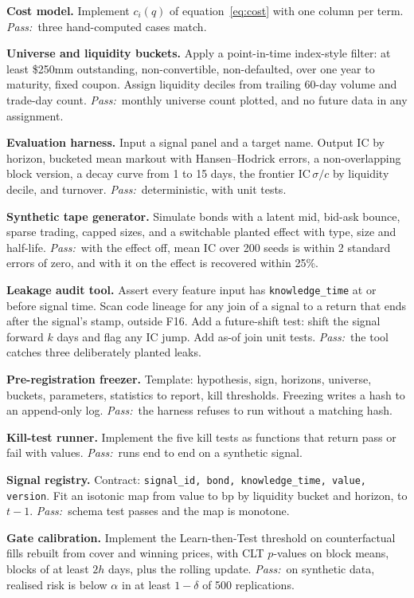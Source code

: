 \documentclass[11pt,letterpaper]{article}
\makeatletter
\newcommand{\code}[1]{\texttt{#1}}
\newcommand*{\twodigit}[1]{\expandafter\@twodigit\csname c@#1\endcsname}
\newcommand*{\@twodigit}[1]{\ifnum#1<10 0\fi\number#1}
\newcommand{\stepname}[1]{\textbf{#1.}}
\newcommand{\Pass}{\textit{Pass:}~}
\makeatother
\begin{document}
\begin{ladder}[label=\textbf{F\twodigit*}]
\item \stepname{Cost model} Implement $c_i(q)$ of equation~\eqref{eq:cost} with one column per term. \Pass three hand-computed cases match.
\item \stepname{Universe and liquidity buckets} Apply a point-in-time index-style filter: at least \$250mm outstanding, non-convertible, non-defaulted, over one year to maturity, fixed coupon. Assign liquidity deciles from trailing 60-day volume and trade-day count. \Pass monthly universe count plotted, and no future data in any assignment.
\item \stepname{Evaluation harness} Input a signal panel and a target name. Output IC by horizon, bucketed mean markout with Hansen--Hodrick errors, a non-overlapping block version, a decay curve from 1 to 15 days, the frontier $\mathrm{IC}\,\sigma/c$ by liquidity decile, and turnover. \Pass deterministic, with unit tests.
\item \stepname{Synthetic tape generator} Simulate bonds with a latent mid, bid-ask bounce, sparse trading, capped sizes, and a switchable planted effect with type, size and half-life. \Pass with the effect off, mean IC over 200 seeds is within 2 standard errors of zero, and with it on the effect is recovered within 25\%.
\item \stepname{Leakage audit tool} Assert every feature input has \code{knowledge_time} at or before signal time. Scan code lineage for any join of a signal to a return that ends after the signal's stamp, outside F16. Add a future-shift test: shift the signal forward $k$ days and flag any IC jump. Add as-of join unit tests. \Pass the tool catches three deliberately planted leaks.
\item \stepname{Pre-registration freezer} Template: hypothesis, sign, horizons, universe, buckets, parameters, statistics to report, kill thresholds. Freezing writes a hash to an append-only log. \Pass the harness refuses to run without a matching hash.
\item \stepname{Kill-test runner} Implement the five kill tests as functions that return pass or fail with values. \Pass runs end to end on a synthetic signal.
\item \stepname{Signal registry} Contract: \code{signal_id, bond, knowledge_time, value, version}. Fit an isotonic map from value to bp by liquidity bucket and horizon, to $t-1$. \Pass schema test passes and the map is monotone.
\item \stepname{Gate calibration} Implement the Learn-then-Test threshold on counterfactual fills rebuilt from cover and winning prices, with CLT $p$-values on block means, blocks of at least $2h$ days, plus the rolling update. \Pass on synthetic data, realised risk is below $\alpha$ in at least $1-\delta$ of 500 replications.

\end{ladder}
\end{document}
